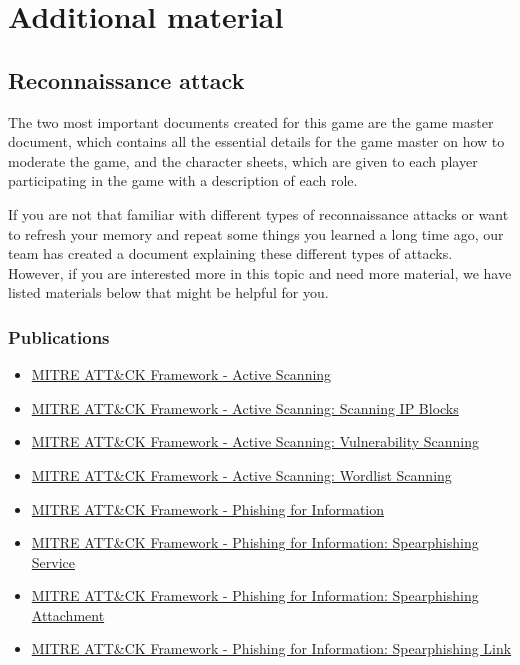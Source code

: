 \chapter{Additional material}
\section{Reconnaissance attack}
The two most important documents created for this game are the game master document, which contains all the essential details for the game master on how to moderate the game, and the character sheets, which are given to each player participating in the game with a description of each role.

If you are not that familiar with different types of reconnaissance attacks or want to refresh your memory and repeat some things you learned a long time ago, our team has created a document explaining these different types of attacks.
However, if you are interested more in this topic and need more material, we have listed materials below that might be helpful for you.

\subsection{Publications}

\begin{itemize}
    \item \href{https://attack.mitre.org/techniques/T1595/}{MITRE ATT\&CK Framework - Active Scanning}
    \item \href{https://attack.mitre.org/techniques/T1595/001/}{MITRE ATT\&CK Framework - Active Scanning: Scanning IP Blocks}
    \item \href{https://attack.mitre.org/techniques/T1595/002/}{MITRE ATT\&CK Framework - Active Scanning: Vulnerability Scanning}
    \item \href{https://attack.mitre.org/techniques/T1595/003/}{MITRE ATT\&CK Framework - Active Scanning: Wordlist Scanning}
    \item \href{https://attack.mitre.org/techniques/T1598/}{MITRE ATT\&CK Framework - Phishing for Information}
    \item \href{https://attack.mitre.org/techniques/T1598/001/}{MITRE ATT\&CK Framework - Phishing for Information: Spearphishing Service} 
    \item \href{https://attack.mitre.org/techniques/T1598/002/}{MITRE ATT\&CK Framework - Phishing for Information: Spearphishing Attachment}
    \item \href{https://attack.mitre.org/techniques/T1598/003/}{MITRE ATT\&CK Framework - Phishing for Information: Spearphishing Link}
\end{itemize}

